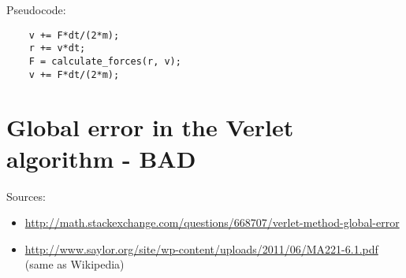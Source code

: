 Pseudocode: 
\begin{verbatim}
    v += F*dt/(2*m);
    r += v*dt;
    F = calculate_forces(r, v);
    v += F*dt/(2*m);
\end{verbatim}




\section{Global error in the Verlet algorithm - BAD}
Sources:
\begin{itemize}
    \item \url{http://math.stackexchange.com/questions/668707/verlet-method-global-error}
    \item \url{http://www.saylor.org/site/wp-content/uploads/2011/06/MA221-6.1.pdf} (same as Wikipedia)
\end{itemize}

